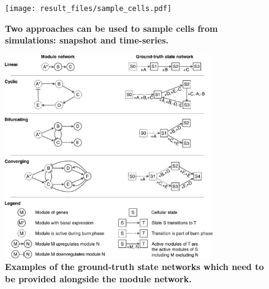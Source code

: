 \documentclass[
  table,
  10pt,
  a4paper]{article}
\begin{document}
\begin{figure}[H]
    \centering
    \texttt{[image: result\_files/sample\_cells.pdf]}
    \caption{
        \textbf{Two approaches can be used to sample cells from simulations: snapshot and time-series.}
    }
    \label{fig:sample_cells}
\end{figure}

\begin{figure}[H]
    \centering
    \includegraphics[width=0.8\textwidth]{result_files/example_backbones}
    \caption{\textbf{Examples of the ground-truth state networks which need to be provided alongside the module network.}}
    \label{fig:example_backbones}
\end{figure}

\printbibliography
\end{document}

